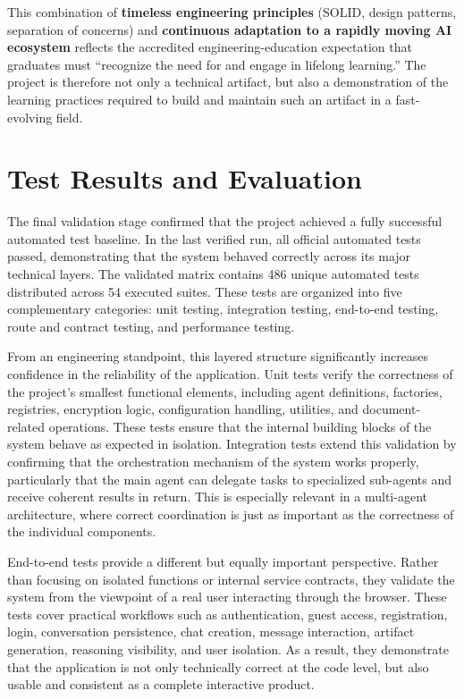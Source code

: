\documentclass[11pt,a4paper]{report}
\begin{document}
This combination of \textbf{timeless engineering principles} (SOLID, design
patterns, separation of concerns) and \textbf{continuous adaptation to a
rapidly moving AI ecosystem} reflects the accredited engineering-education
expectation that graduates must ``recognize the need for and engage in
lifelong learning.'' The project is therefore not only a technical artifact,
but also a demonstration of the learning practices required to build and
maintain such an artifact in a fast-evolving field.

\chapter{Test Results and Evaluation}

The final validation stage confirmed that the project achieved a fully
successful automated test baseline. In the last verified run, all official
automated tests passed, demonstrating that the system behaved correctly
across its major technical layers. The validated matrix contains 486 unique
automated tests distributed across 54 executed suites. These tests are
organized into five complementary categories: unit testing, integration
testing, end-to-end testing, route and contract testing, and performance
testing.

From an engineering standpoint, this layered structure significantly
increases confidence in the reliability of the application. Unit tests
verify the correctness of the project's smallest functional elements,
including agent definitions, factories, registries, encryption logic,
configuration handling, utilities, and document-related operations. These
tests ensure that the internal building blocks of the system behave as
expected in isolation. Integration tests extend this validation by
confirming that the orchestration mechanism of the system works properly,
particularly that the main agent can delegate tasks to specialized sub-agents
and receive coherent results in return. This is especially relevant in a
multi-agent architecture, where correct coordination is just as important as
the correctness of the individual components.

End-to-end tests provide a different but equally important perspective.
Rather than focusing on isolated functions or internal service contracts,
they validate the system from the viewpoint of a real user interacting
through the browser. These tests cover practical workflows such as
authentication, guest access, registration, login, conversation persistence,
chat creation, message interaction, artifact generation, reasoning
visibility, and user isolation. As a result, they demonstrate that the
application is not only technically correct at the code level, but also
usable and consistent as a complete interactive product.
\end{document}
